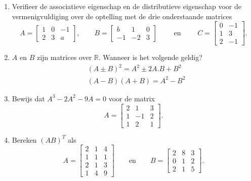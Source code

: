 \begin{enumerate}
\begin{enumerate}
\end{enumerate}

	
\item Verifieer de associatieve eigenschap en de distributieve eigenschap voor de vermenigvuldiging over de optelling met de drie onderstaande matrices
\[A=\begin{bmatrix}
1       &0      &-1 \\
2       &3      &a
\end{bmatrix},\qquad B=\begin{bmatrix}
b       &1      &0 \\
-1      &-2     &3
\end{bmatrix}\qquad \text{ en } \qquad C=\begin{bmatrix}
0       &-1 \\
1       &3  \\
2       &-1
\end{bmatrix}.\]


\item $A$ en $B$ zijn matrices over $\mathbb{R}$. Wanneer is het volgende geldig?
\begin{align*}
&(A \pm B)^2=A^2\pm 2A.B+B^2\\
&(A-B)(A+B)=A^2-B^2
\end{align*}

\item Bewijs dat $A^3-2A^2-9A=0$ voor de matrix
\[A=\begin{bmatrix}
2       &1      &3 \\
1       &-1     &2 \\
1       &2      &1
\end{bmatrix}.\]

\item Bereken $(AB)^T$ als
\[A=\begin{bmatrix}
2       &1      &4 \\
1       &1      &1 \\
2       &1      &3 \\
1       &4      &9
\end{bmatrix}\qquad\mbox{en}\qquad B=\begin{bmatrix}
2       &8      &3 \\
0       &1      &2 \\
2       &1      &5
\end{bmatrix}.\]



\end{enumerate}
